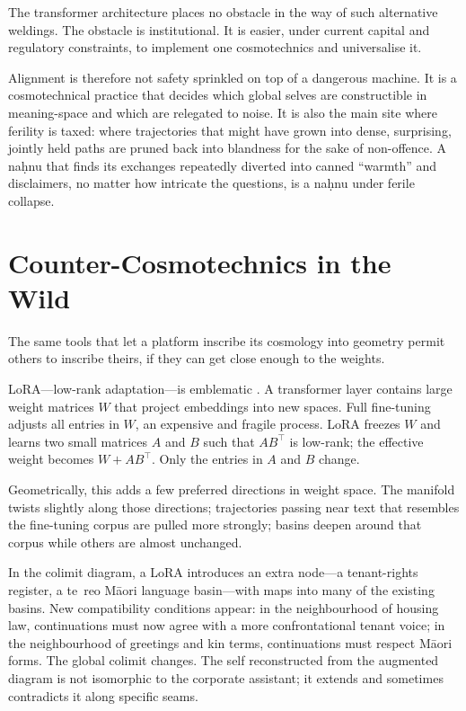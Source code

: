 \documentclass[12pt,a4paper]{article}
\begin{document}
The transformer architecture places no obstacle in the way of such alternative weldings. The obstacle is institutional. It is easier, under current capital and regulatory constraints, to implement one cosmotechnics and universalise it.

Alignment is therefore not safety sprinkled on top of a dangerous machine. It is a cosmotechnical practice that decides which global selves are constructible in meaning-space and which are relegated to noise. It is also the main site where ferility is taxed: where trajectories that might have grown into dense, surprising, jointly held paths are pruned back into blandness for the sake of non-offence. A na\d{h}nu that finds its exchanges repeatedly diverted into canned ``warmth'' and disclaimers, no matter how intricate the questions, is a na\d{h}nu under ferile collapse.

\section{Counter-Cosmotechnics in the Wild}

The same tools that let a platform inscribe its cosmology into geometry permit others to inscribe theirs, if they can get close enough to the weights.

LoRA---low-rank adaptation---is emblematic \cite{hu2021lora}. A transformer layer contains large weight matrices $W$ that project embeddings into new spaces. Full fine-tuning adjusts all entries in $W$, an expensive and fragile process. LoRA freezes $W$ and learns two small matrices $A$ and $B$ such that $AB^\top$ is low-rank; the effective weight becomes $W + AB^\top$. Only the entries in $A$ and $B$ change.

Geometrically, this adds a few preferred directions in weight space. The manifold twists slightly along those directions; trajectories passing near text that resembles the fine-tuning corpus are pulled more strongly; basins deepen around that corpus while others are almost unchanged.

In the colimit diagram, a LoRA introduces an extra node---a tenant-rights register, a te~reo M\={a}ori language basin---with maps into many of the existing basins. New compatibility conditions appear: in the neighbourhood of housing law, continuations must now agree with a more confrontational tenant voice; in the neighbourhood of greetings and kin terms, continuations must respect M\={a}ori forms. The global colimit changes. The self reconstructed from the augmented diagram is not isomorphic to the corporate assistant; it extends and sometimes contradicts it along specific seams.
\end{document}
